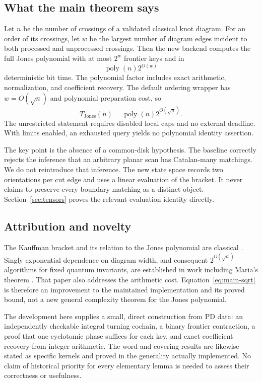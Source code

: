 \documentclass[11pt]{article}
\theoremstyle{definition}
\theoremstyle{remark}
\newcommand{\poly}{\operatorname{poly}}
\begin{document}
\subsection{What the main theorem says}

Let $n$ be the number of crossings of a validated classical knot diagram.
For an order of its crossings, let $w$ be the largest number of diagram
edges incident to both processed and unprocessed crossings. Then the new
backend computes the full Jones polynomial with at most $2^w$ frontier keys
and in
\begin{equation}\label{eq:main-width}
 \poly(n)2^{O(w)}
\end{equation}
deterministic bit time. The polynomial factor includes exact arithmetic,
normalization, and coefficient recovery. The default ordering wrapper has
$w=O(\sqrt n)$ and polynomial preparation cost, so
\begin{equation}\label{eq:main-sqrt}
 T_{\mathrm{Jones}}(n)=\poly(n)2^{O(\sqrt n)}.
\end{equation}
The unrestricted statement requires disabled local caps and no external
deadline. With limits enabled, an exhausted query yields no polynomial
identity assertion.

The key point is the absence of a common-disk hypothesis. The baseline
correctly rejects the inference that an arbitrary planar scan has
Catalan-many matchings. We do not reintroduce that inference. The new state
space records two orientations per cut edge and uses a linear evaluation
of the bracket. It never claims to preserve every boundary matching as a
distinct object. Section~\ref{sec:tensors} proves the relevant evaluation
identity directly.

\subsection{Attribution and novelty}

The Kauffman bracket and its relation to the Jones polynomial are classical
\cite{kauffman1987}. Singly exponential dependence on diagram width, and
consequent $2^{O(\sqrt n)}$ algorithms for fixed quantum invariants, are
established in work including Maria's theorem \cite{maria2021}. That paper
also addresses the arithmetic cost. Equation~\eqref{eq:main-sqrt} is
therefore an improvement to the maintained implementation and its proved
bound, not a new general complexity theorem for the Jones polynomial.

The development here supplies a small, direct construction from PD data:
an independently checkable integral turning cochain, a binary frontier
contraction, a proof that one cyclotomic phase suffices for each key, and
exact coefficient recovery from integer arithmetic. The word and covering
results are likewise stated as specific kernels and proved in the
generality actually implemented. No claim of historical priority for every
elementary lemma is needed to assess their correctness or usefulness.
\end{document}
